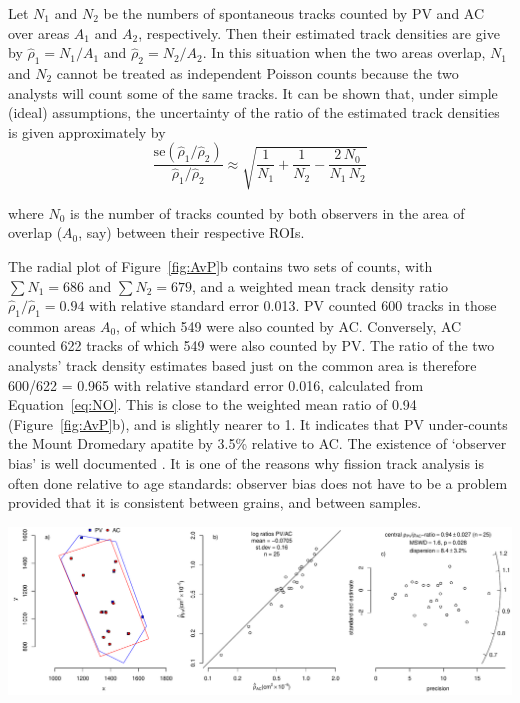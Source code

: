 \documentclass[gchron, manuscript]{copernicus}
\begin{document}
Let $N_1$ and $N_2$ be the numbers of spontaneous tracks counted by PV
and AC over areas $A_1$ and $A_2$, respectively. Then their estimated
track densities are give by $\hat{\rho}_1 = N_1/A_1$ and $\hat{\rho}_2
= N_2/A_2$. In this situation when the two areas overlap, $N_1$ and
$N_2$ cannot be treated as independent Poisson counts because the two
analysts will count some of the same tracks. It can be shown that,
under simple (ideal) assumptions, the uncertainty of the ratio of the
estimated track densities is given approximately by
\begin{equation}
  \frac{\mbox{se}(\hat{\rho}_1/\hat{\rho}_2)}{\hat{\rho}_1/\hat{\rho}_2} \approx
  \sqrt{ \frac{1}{N_1} + \frac{1}{N_2} - \frac{2\,N_0}{N_1\,N_2} }
  \label{eq:NO}
\end{equation}

\noindent where $N_0$ is the number of tracks counted by both
observers in the area of overlap ($A_0$, say) between their respective
ROIs.\medskip 

The radial plot of Figure~\ref{fig:AvP}b contains two sets of counts,
with $\sum N_{1} = 686$ and $\sum N_{2} = 679$, and a weighted mean
track density ratio $\hat{\rho}_{1}/\hat{\rho}_{1} = 0.94$ with
relative standard error 0.013. PV counted 600 tracks in those common
areas $A_0$, of which 549 were also counted by AC. Conversely, AC
counted 622 tracks of which 549 were also counted by PV. The ratio of
the two analysts' track density estimates based just on the common
area is therefore 600/622 = 0.965 with relative standard error 0.016,
calculated from Equation~\ref{eq:NO}. This is close to the weighted
mean ratio of 0.94 (Figure~\ref{fig:AvP}b), and is slightly nearer to
1. It indicates that PV under-counts the Mount Dromedary apatite by
3.5\% relative to AC.  The existence of `observer bias' is well
documented \citep{tamer2025}.  It is one of the reasons why fission
track analysis is often done relative to age standards: observer bias
does not have to be a problem provided that it is consistent between
grains, and between samples.\medskip

{ \centering \includegraphics[width=\linewidth]{AvP.pdf}
  \label{fig:AvP}
}%
\end{document}
